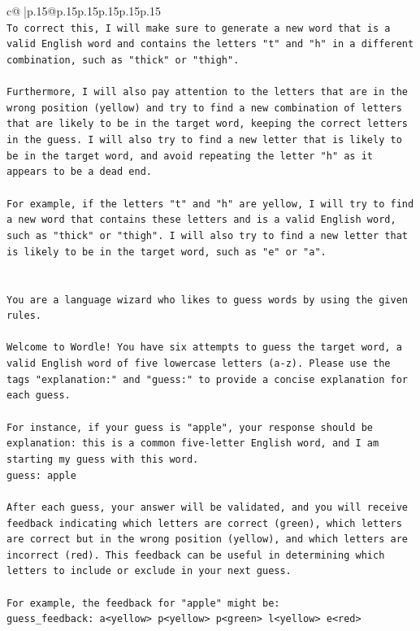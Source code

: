 \documentclass{article}
\begin{document}
{\begin{supertabular}{c@{$\;$}|p{.15\linewidth}@{}p{.15\linewidth}p{.15\linewidth}p{.15\linewidth}p{.15\linewidth}p{.15\linewidth}}
{{{\\ 
\texttt{To correct this, I will make sure to generate a new word that is a valid English word and contains the letters "t" and "h" in a different combination, such as "thick" or "thigh". } \\
\\ 
\texttt{Furthermore, I will also pay attention to the letters that are in the wrong position (yellow) and try to find a new combination of letters that are likely to be in the target word, keeping the correct letters in the guess. I will also try to find a new letter that is likely to be in the target word, and avoid repeating the letter "h" as it appears to be a dead end. } \\
\\ 
\texttt{For example, if the letters "t" and "h" are yellow, I will try to find a new word that contains these letters and is a valid English word, such as "thick" or "thigh". I will also try to find a new letter that is likely to be in the target word, such as "e" or "a".} \\
\\ 
\\ 
\texttt{You are a language wizard who likes to guess words by using the given rules.} \\
\\ 
\texttt{Welcome to Wordle! You have six attempts to guess the target word, a valid English word of five lowercase letters (a{-}z). Please use the tags "explanation:" and "guess:" to provide a concise explanation for each guess.} \\
\\ 
\texttt{For instance, if your guess is "apple", your response should be} \\
\texttt{explanation: this is a common five{-}letter English word, and I am starting my guess with this word.} \\
\texttt{guess: apple} \\
\\ 
\texttt{After each guess, your answer will be validated, and you will receive feedback indicating which letters are correct (green), which letters are correct but in the wrong position (yellow), and which letters are incorrect (red). This feedback can be useful in determining which letters to include or exclude in your next guess.} \\
\\ 
\texttt{For example, the feedback for "apple" might be:} \\
\texttt{guess\_feedback: a<yellow> p<yellow> p<green> l<yellow> e<red>} \\
}}}
\end{supertabular}}
\end{document}
